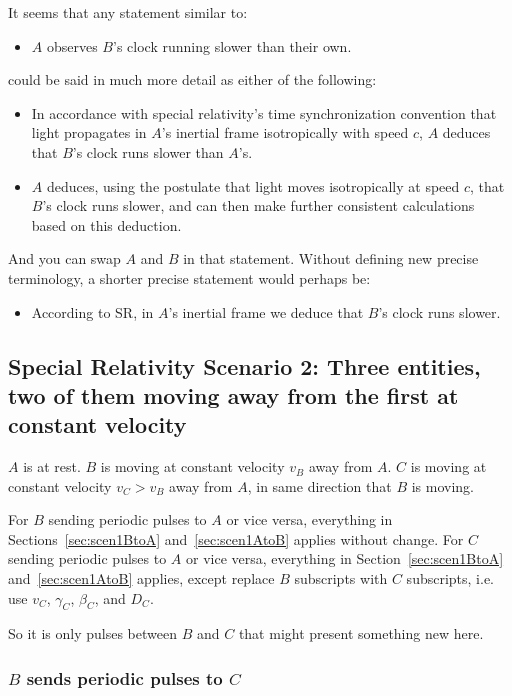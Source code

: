 \documentclass[a4paper]{article}
\theoremstyle{plain}
\theoremstyle{definition}
\begin{document}
It seems that any statement similar to:
\begin{itemize}
\item $A$ observes $B$'s clock running slower than their own.
\end{itemize}
could be said in much more detail as either of the following:
\begin{itemize}
\item In accordance with special relativity's time synchronization
  convention that light propagates in $A$'s inertial frame
  isotropically with speed $c$, $A$ deduces that $B$'s clock runs
  slower than $A$'s.
\item $A$ deduces, using the postulate that light moves isotropically
  at speed $c$, that $B$’s clock runs slower, and can then make
  further consistent calculations based on this deduction.
\end{itemize}
And you can swap $A$ and $B$ in that statement.  Without defining new
precise terminology, a shorter precise statement would perhaps be:
\begin{itemize}
\item According to SR, in $A$'s inertial frame we deduce that $B$'s
  clock runs slower.
\end{itemize}


\subsection{Special Relativity Scenario 2: Three entities, two of them moving away from the first at constant velocity}
\label{sec:scen2}

$A$ is at rest.
$B$ is moving at constant velocity $v_B$ away from $A$.
$C$ is moving at constant velocity $v_C > v_B$ away from $A$, in same
direction that $B$ is moving.

For $B$ sending periodic pulses to $A$ or vice versa, everything in
Sections~\ref{sec:scen1BtoA} and~\ref{sec:scen1AtoB} applies without
change.
For $C$ sending periodic pulses to $A$ or vice versa, everything in
Section~\ref{sec:scen1BtoA} and~\ref{sec:scen1AtoB} applies,
except replace $B$ subscripts
with $C$ subscripts, i.e. use $v_C$, $\gamma_C$, $\beta_C$, and $D_C$.

So it is only pulses between $B$ and $C$ that might present something
new here.


\subsubsection{$B$ sends periodic pulses to $C$}
\label{sec:scen2BtoCLETfriendly}
\end{document}
